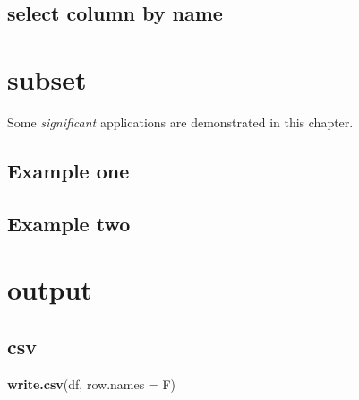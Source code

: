 \documentclass[
]{book}
\newenvironment{Shaded}{\begin{snugshade}}{\end{snugshade}}
\newcommand{\DataTypeTok}[1]{\textcolor[rgb]{0.13,0.29,0.53}{#1}}
\newcommand{\KeywordTok}[1]{\textcolor[rgb]{0.13,0.29,0.53}{\textbf{#1}}}
\newcommand{\NormalTok}[1]{#1}
\newcommand{\OperatorTok}[1]{\textcolor[rgb]{0.81,0.36,0.00}{\textbf{#1}}}
\newcommand{\StringTok}[1]{\textcolor[rgb]{0.31,0.60,0.02}{#1}}
\begin{document}
\begin{Shaded}
\end{Shaded}

\hypertarget{select-column-by-name}{%
\section{select column by name}\label{select-column-by-name}}

\begin{Shaded}
\end{Shaded}

\hypertarget{subset}{%
\chapter{subset}\label{subset}}

Some \emph{significant} applications are demonstrated in this chapter.

\hypertarget{example-one}{%
\section{Example one}\label{example-one}}

\hypertarget{example-two}{%
\section{Example two}\label{example-two}}

\hypertarget{output}{%
\chapter{output}\label{output}}

\hypertarget{csv}{%
\section{csv}\label{csv}}

\begin{Shaded}
\begin{Highlighting}[]
\KeywordTok{write.csv}\NormalTok{(df, }\DataTypeTok{row.names =}\NormalTok{ F)}
\end{Highlighting}
\end{Shaded}

  
\end{document}
